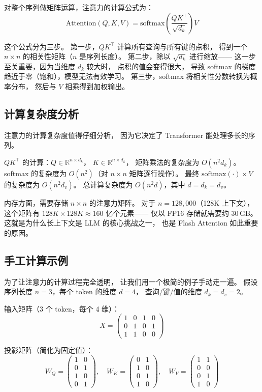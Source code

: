 对整个序列做矩阵运算，注意力的计算公式为：
\begin{equation}
  \mathrm{Attention}(Q, K, V)
  = \mathrm{softmax}\!\left(\frac{Q K^\top}{\sqrt{d_k}}\right) V
  \label{eq:attention}
\end{equation}

这个公式分为三步。
第一步，$QK^\top$ 计算所有查询与所有键的点积，
得到一个 $n \times n$ 的相关性矩阵（$n$ 是序列长度）。
第二步，除以 $\sqrt{d_k}$ 进行缩放——
这一步至关重要，因为当维度 $d_k$ 较大时，
点积的值会变得很大，
导致 softmax 的梯度趋近于零（饱和），模型无法有效学习。
第三步，softmax 将相关性分数转换为概率分布，
然后与 $V$ 相乘得到加权输出。

\subsection{计算复杂度分析}

注意力的计算复杂度值得仔细分析，
因为它决定了 Transformer 能处理多长的序列。

$QK^\top$ 的计算：$Q \in \mathbb{R}^{n \times d_k}$，
$K \in \mathbb{R}^{n \times d_k}$，
矩阵乘法的复杂度为 $O(n^2 d_k)$。
softmax 的复杂度为 $O(n^2)$（对 $n \times n$ 矩阵逐行操作）。
最终 $\mathrm{softmax}(\cdot) \times V$ 的复杂度为 $O(n^2 d_v)$。
总计算复杂度为 $O(n^2 d)$，其中 $d = d_k = d_v$。

内存方面，需要存储 $n \times n$ 的注意力矩阵。
对于 $n = 128{,}000$（128K 上下文），
这个矩阵有 $128K \times 128K \approx 160$ 亿个元素——
仅以 FP16 存储就需要约 30\,GB。
这就是为什么长上下文是 LLM 的核心挑战之一，
也是 Flash Attention 如此重要的原因。

\subsection{手工计算示例}

为了让注意力的计算过程完全透明，
让我们用一个极简的例子手动走一遍。
假设序列长度 $n = 3$，每个 token 的维度 $d = 4$，
查询/键/值的维度 $d_k = d_v = 2$。

输入矩阵（3 个 token，每个 4 维）：
\[
X = \begin{pmatrix}
  1 & 0 & 1 & 0 \\
  0 & 1 & 0 & 1 \\
  1 & 1 & 0 & 0
\end{pmatrix}
\]

投影矩阵（简化为固定值）：
\[
W_Q = \begin{pmatrix} 1 & 0 \\ 0 & 1 \\ 1 & 0 \\ 0 & 1 \end{pmatrix}, \quad
W_K = \begin{pmatrix} 0 & 1 \\ 1 & 0 \\ 0 & 1 \\ 1 & 0 \end{pmatrix}, \quad
W_V = \begin{pmatrix} 1 & 1 \\ 0 & 0 \\ 0 & 1 \\ 1 & 0 \end{pmatrix}
\]

